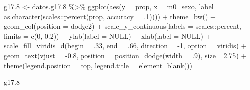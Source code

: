 \documentclass[
  12pt,
]{book}
\newenvironment{Shaded}{\begin{snugshade}}{\end{snugshade}}
\newcommand{\AttributeTok}[1]{\textcolor[rgb]{0.77,0.63,0.00}{#1}}
\newcommand{\ConstantTok}[1]{\textcolor[rgb]{0.00,0.00,0.00}{#1}}
\newcommand{\DecValTok}[1]{\textcolor[rgb]{0.00,0.00,0.81}{#1}}
\newcommand{\FloatTok}[1]{\textcolor[rgb]{0.00,0.00,0.81}{#1}}
\newcommand{\FunctionTok}[1]{\textcolor[rgb]{0.00,0.00,0.00}{#1}}
\newcommand{\NormalTok}[1]{#1}
\newcommand{\OtherTok}[1]{\textcolor[rgb]{0.56,0.35,0.01}{#1}}
\newcommand{\SpecialCharTok}[1]{\textcolor[rgb]{0.00,0.00,0.00}{#1}}
\newcommand{\StringTok}[1]{\textcolor[rgb]{0.31,0.60,0.02}{#1}}
\begin{document}
\begin{Shaded}
\begin{Highlighting}[]
\NormalTok{g17}\FloatTok{.8} \OtherTok{\textless{}{-}}\NormalTok{ datos.g17}\FloatTok{.8} \SpecialCharTok{\%\textgreater{}\%} 
  \FunctionTok{ggplot}\NormalTok{(}\FunctionTok{aes}\NormalTok{(}\AttributeTok{y =}\NormalTok{ prop, }\AttributeTok{x =}\NormalTok{ m0\_sexo, }
             \AttributeTok{label =} \FunctionTok{as.character}\NormalTok{(scales}\SpecialCharTok{::}\FunctionTok{percent}\NormalTok{(prop, }\AttributeTok{accuracy =}\NormalTok{ .}\DecValTok{1}\NormalTok{)))) }\SpecialCharTok{+}
  \FunctionTok{theme\_bw}\NormalTok{() }\SpecialCharTok{+} 
  \FunctionTok{geom\_col}\NormalTok{(}\AttributeTok{position =} \StringTok{\textquotesingle{}dodge2\textquotesingle{}}\NormalTok{) }\SpecialCharTok{+}
  \FunctionTok{scale\_y\_continuous}\NormalTok{(}\AttributeTok{labels =}\NormalTok{ scales}\SpecialCharTok{::}\NormalTok{percent,}
                     \AttributeTok{limits =} \FunctionTok{c}\NormalTok{(}\DecValTok{0}\NormalTok{, }\FloatTok{0.2}\NormalTok{)) }\SpecialCharTok{+}
  \FunctionTok{ylab}\NormalTok{(}\AttributeTok{label =} \ConstantTok{NULL}\NormalTok{) }\SpecialCharTok{+}
  \FunctionTok{xlab}\NormalTok{(}\AttributeTok{label =} \ConstantTok{NULL}\NormalTok{) }\SpecialCharTok{+}
  \FunctionTok{scale\_fill\_viridis\_d}\NormalTok{(}\AttributeTok{begin =}\NormalTok{ .}\DecValTok{33}\NormalTok{, }\AttributeTok{end =}\NormalTok{ .}\DecValTok{66}\NormalTok{, }\AttributeTok{direction =} \SpecialCharTok{{-}}\DecValTok{1}\NormalTok{, }\AttributeTok{option =} \StringTok{\textquotesingle{}viridis\textquotesingle{}}\NormalTok{) }\SpecialCharTok{+}
  \FunctionTok{geom\_text}\NormalTok{(}\AttributeTok{vjust =} \SpecialCharTok{{-}}\FloatTok{0.8}\NormalTok{,}
            \AttributeTok{position =} \FunctionTok{position\_dodge}\NormalTok{(}\AttributeTok{width =}\NormalTok{ .}\DecValTok{9}\NormalTok{),}
            \AttributeTok{size=} \FloatTok{2.75}\NormalTok{)  }\SpecialCharTok{+} 
  \FunctionTok{theme}\NormalTok{(}\AttributeTok{legend.position =} \StringTok{\textquotesingle{}top\textquotesingle{}}\NormalTok{,}
        \AttributeTok{legend.title =} \FunctionTok{element\_blank}\NormalTok{())}

\NormalTok{g17}\FloatTok{.8}
\end{Highlighting}
\end{Shaded}
\end{document}
